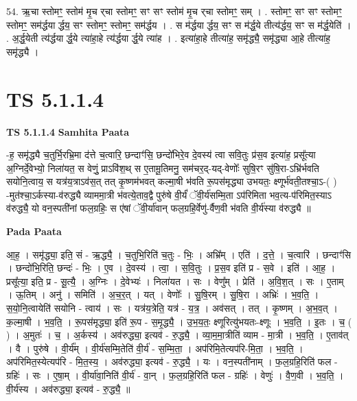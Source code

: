 \documentclass[17pt]{extarticle}
\begin{document}
54. ऋ॒चा स्तोमꣳ॒॒ स्तोम॑ मृ॒च र्‌चा स्तोमꣳ॒॒ सꣳ सꣳ स्तोम॑ मृ॒च र्‌चा स्तोमꣳ॒॒ सम् । . स्तोमꣳ॒॒ सꣳ सꣳ स्तोमꣳ॒॒ स्तोमꣳ॒॒ सम॑र्द्धया र्द्धय॒ सꣳ स्तोमꣳ॒॒ स्तोमꣳ॒॒ 
सम॑र्द्धय । . स म॑र्द्धया र्द्धय॒ सꣳ स म॑र्द्ध॒ये तीत्य॑र्द्धय॒ सꣳ स म॑र्द्ध॒येति॑ । . अ॒र्द्ध॒येती त्य॑र्द्धया र्द्ध॒ये त्या॑हा॒हे त्य॑र्द्धया र्द्ध॒ये त्या॑ह । . इत्या॑हा॒हे तीत्या॑ह॒ समृ॑द्ध्यै॒ समृ॑द्ध्या आ॒हे तीत्या॑ह॒ समृ॑द्ध्यै । \newline
\pagebreak
{}

\section{ TS 5.1.1.4 }

\textbf{TS 5.1.1.4 } \newline
\textbf{Samhita Paata} \newline

-ह॒ समृ॑द्ध्यै च॒तुर्भि॒रभ्रि॒मा द॑त्ते च॒त्वारि॒ छन्दाꣳ॑सि॒ छन्दो॑भिरे॒व दे॒वस्य॑ त्वा सवि॒तुः प्र॑स॒व इत्या॑ह॒ प्रसू᳚त्या अ॒ग्निर्दे॒वेभ्यो॒ निला॑यत॒ स वेणुं॒ प्राऽवि॑श॒थ् स ए॒तामू॒तिमनु॒ सम॑चर॒द्-यद्-वेणोः᳚ सुषि॒रꣳ सु॑षि॒रा-ऽभ्रि॑र्भवति सयोनि॒त्वाय॒ स यत्र॑य॒त्राऽव॑स॒त् तत् कृ॒ष्णम॑भवत् कल्मा॒षी भ॑वति रू॒पस॑मृद्ध्या उभयतः॒ क्ष्णूर्भ॑वती॒तश्चा॒ऽ-( ) -मुत॑श्चा॒ऽर्कस्या-व॑रुद्ध्यै व्याममा॒त्री भ॑वत्ये॒ताव॒द्वै पुरु॑षे वी॒र्यं॑ ॅवी॒र्य॑सम्मि॒ता ऽप॑रिमिता भव॒त्य-प॑रिमित॒स्याऽ व॑रुद्ध्यै॒ यो वन॒स्पती॑नां फल॒ग्रहिः॒ स ए॑षां ॅवी॒र्या॑वान् फल॒ग्रहि॒र्वेणु॑-र्वैण॒वी भ॑वति वी॒र्य॑स्या व॑रुद्ध्यै ॥ \newline

\textbf{Pada Paata} \newline

आ॒ह॒ । समृ॑द्ध्या॒ इति॒ सं - ऋ॒द्ध्यै॒ । च॒तुभि॒रिति॑ च॒तुः - भिः॒ । अभ्रि᳚म् । एति॑ । द॒त्ते॒ । च॒त्वारि॑ । छन्दाꣳ॑सि । छन्दो॑भि॒रिति॒ छन्दः॑ - भिः॒ । ए॒व । दे॒वस्य॑ । त्वा॒ । स॒वि॒तुः । प्र॒स॒व इति॑ प्र - स॒वे । इति॑ । आ॒ह॒ । प्रसू᳚त्या॒ इति॒ प्र - सू॒त्यै॒ । अ॒ग्निः । दे॒वेभ्यः॑ । निला॑यत । सः । वेणु᳚म् । प्रेति॑ । अ॒वि॒श॒त् । सः । ए॒ताम् । ऊ॒तिम् । अनु॑ । समिति॑ । अ॒च॒र॒त् । यत् । वेणोः᳚ । सु॒षि॒रम् । सु॒षि॒रा । अभ्रिः॑ । भ॒व॒ति॒ । स॒यो॒नि॒त्वायेति॑ सयोनि - त्वाय॑ । सः । यत्र॑य॒त्रेति॒ यत्र॑ - य॒त्र॒ । अव॑सत् । तत् । कृ॒ष्णम् । अ॒भ॒व॒त् । क॒ल्मा॒षी । भ॒व॒ति॒ । रू॒पस॑मृद्ध्या॒ इति॑ रू॒प - स॒मृ॒द्ध्यै॒ । उ॒भ॒य॒तः॒ क्ष्णूरित्यु॑भयतः-क्ष्णूः । भ॒व॒ति॒ । इ॒तः । च॒ ( ) । अ॒मुतः॑ । च॒ । अ॒र्कस्य॑ । अव॑रुद्ध्या॒ इत्यव॑ - रु॒द्ध्यै॒ । व्या॒म॒मा॒त्रीति॑ व्याम - मा॒त्री । भ॒व॒ति॒ । ए॒ताव॑त् । वै । पुरु॑षे । वी॒र्य᳚म् । वी॒र्य॑सम्मि॒तेति॑ वी॒र्य॑ - स॒म्मि॒ता॒ । अप॑रिमि॒तेत्यप॑रि-मि॒ता॒ । भ॒व॒ति॒ । अप॑रिमित॒स्येत्यप॑रि - मि॒त॒स्य॒ । अव॑रुद्ध्या॒ इत्यव॑ - रु॒द्ध्यै॒ । यः । वन॒स्पती॑नाम् । फ॒ल॒ग्रहि॒रिति॑ फल - ग्रहिः॑ । सः । ए॒षा॒म् । वी॒र्या॑वा॒निति॑ वी॒र्य॑ - वा॒न् । फ॒ल॒ग्रहि॒रिति॑ फल - ग्रहिः॑ । वेणुः॑ । वै॒ण॒वी । भ॒व॒ति॒ । वी॒र्य॑स्य । अव॑रुद्ध्या॒ इत्यव॑ - रु॒द्ध्यै॒ ॥  \newline
\end{document}
